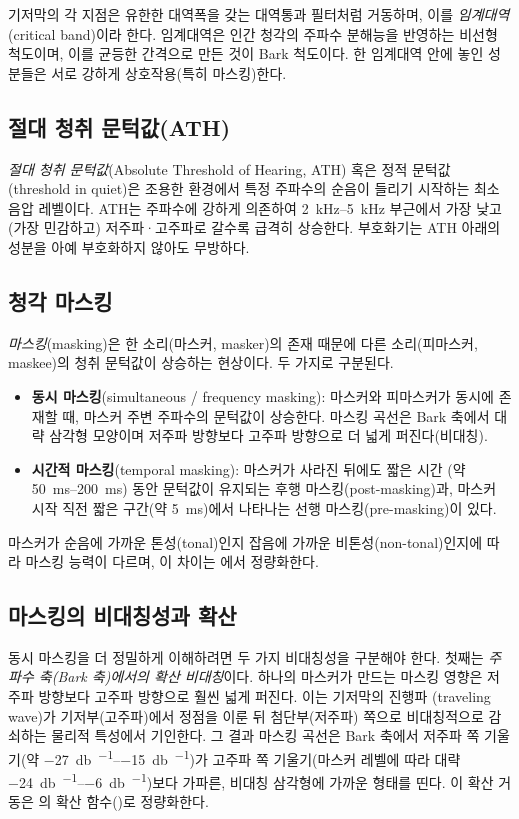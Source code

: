 \documentclass[11pt,a4paper]{article}
\begin{document}
기저막의 각 지점은 유한한 대역폭을 갖는 대역통과 필터처럼 거동하며, 이를
\emph{임계대역}(critical band)이라 한다. 임계대역은 인간 청각의 주파수 분해능을
반영하는 비선형 척도이며, 이를 균등한 간격으로 만든 것이 Bark 척도이다. 한 임계대역
안에 놓인 성분들은 서로 강하게 상호작용(특히 마스킹)한다.

\subsection{절대 청취 문턱값(ATH)}
\emph{절대 청취 문턱값}(Absolute Threshold of Hearing, ATH) 혹은 정적 문턱값(threshold
in quiet)은 조용한 환경에서 특정 주파수의 순음이 들리기 시작하는 최소 음압
레벨이다. ATH는 주파수에 강하게 의존하여 \SIrange{2}{5}{\kilo\hertz} 부근에서 가장
낮고(가장 민감하고) 저주파·고주파로 갈수록 급격히 상승한다. 부호화기는 ATH 아래의
성분을 아예 부호화하지 않아도 무방하다.

\subsection{청각 마스킹}
\emph{마스킹}(masking)은 한 소리(마스커, masker)의 존재 때문에 다른 소리(피마스커,
maskee)의 청취 문턱값이 상승하는 현상이다. 두 가지로 구분된다.
\begin{itemize}
  \item \textbf{동시 마스킹}(simultaneous / frequency masking): 마스커와 피마스커가
        동시에 존재할 때, 마스커 주변 주파수의 문턱값이 상승한다. 마스킹 곡선은
        Bark 축에서 대략 삼각형 모양이며 저주파 방향보다 고주파 방향으로 더 넓게
        퍼진다(비대칭).
  \item \textbf{시간적 마스킹}(temporal masking): 마스커가 사라진 뒤에도 짧은 시간
        (약 \SIrange{50}{200}{\milli\second}) 동안 문턱값이 유지되는 후행
        마스킹(post-masking)과, 마스커 시작 직전 짧은 구간(약
        \SI{5}{\milli\second})에서 나타나는 선행 마스킹(pre-masking)이 있다.
\end{itemize}
마스커가 순음에 가까운 톤성(tonal)인지 잡음에 가까운 비톤성(non-tonal)인지에 따라
마스킹 능력이 다르며, 이 차이는 에서 정량화한다.

\subsection{마스킹의 비대칭성과 확산}
동시 마스킹을 더 정밀하게 이해하려면 두 가지 비대칭성을 구분해야 한다. 첫째는
\emph{주파수 축(Bark 축)에서의 확산 비대칭}이다. 하나의 마스커가 만드는 마스킹
영향은 저주파 방향보다 고주파 방향으로 훨씬 넓게 퍼진다. 이는 기저막의 진행파
(traveling wave)가 기저부(고주파)에서 정점을 이룬 뒤 첨단부(저주파) 쪽으로
비대칭적으로 감쇠하는 물리적 특성에서 기인한다. 그 결과 마스킹 곡선은 Bark 축에서
저주파 쪽 기울기(약 \SIrange{-27}{-15}{\decibel\per\bark})가 고주파 쪽 기울기(마스커
레벨에 따라 대략 \SIrange{-24}{-6}{\decibel\per\bark})보다 가파른, 비대칭
삼각형에 가까운 형태를 띤다. 이 확산 거동은 의 확산
함수()로 정량화한다.
\end{document}

